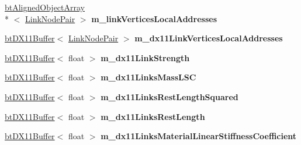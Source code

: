 \begin{DoxyCompactItemize}
\item 
\hypertarget{classbt_soft_body_link_data_d_x11_s_i_m_d_aware_acc9532e1a7457a277f5bc7fff7cd028b}{\hyperlink{classbt_aligned_object_array}{bt\+Aligned\+Object\+Array}\\*
$<$ \hyperlink{classbt_soft_body_link_data_1_1_link_node_pair}{Link\+Node\+Pair} $>$ {\bfseries m\+\_\+link\+Vertices\+Local\+Addresses}}\label{classbt_soft_body_link_data_d_x11_s_i_m_d_aware_acc9532e1a7457a277f5bc7fff7cd028b}

\item 
\hypertarget{classbt_soft_body_link_data_d_x11_s_i_m_d_aware_ab89aba249daf8a40190fc208f2df0403}{\hyperlink{classbt_d_x11_buffer}{bt\+D\+X11\+Buffer}$<$ \hyperlink{classbt_soft_body_link_data_1_1_link_node_pair}{Link\+Node\+Pair} $>$ {\bfseries m\+\_\+dx11\+Link\+Vertices\+Local\+Addresses}}\label{classbt_soft_body_link_data_d_x11_s_i_m_d_aware_ab89aba249daf8a40190fc208f2df0403}

\item 
\hypertarget{classbt_soft_body_link_data_d_x11_s_i_m_d_aware_a219c48253b7715d8bd642c0ba37d5d36}{\hyperlink{classbt_d_x11_buffer}{bt\+D\+X11\+Buffer}$<$ float $>$ {\bfseries m\+\_\+dx11\+Link\+Strength}}\label{classbt_soft_body_link_data_d_x11_s_i_m_d_aware_a219c48253b7715d8bd642c0ba37d5d36}

\item 
\hypertarget{classbt_soft_body_link_data_d_x11_s_i_m_d_aware_a690735a2a6db8264d0648b706cb28d03}{\hyperlink{classbt_d_x11_buffer}{bt\+D\+X11\+Buffer}$<$ float $>$ {\bfseries m\+\_\+dx11\+Links\+Mass\+L\+S\+C}}\label{classbt_soft_body_link_data_d_x11_s_i_m_d_aware_a690735a2a6db8264d0648b706cb28d03}

\item 
\hypertarget{classbt_soft_body_link_data_d_x11_s_i_m_d_aware_ad003b579e9a36d503de679a340011a2a}{\hyperlink{classbt_d_x11_buffer}{bt\+D\+X11\+Buffer}$<$ float $>$ {\bfseries m\+\_\+dx11\+Links\+Rest\+Length\+Squared}}\label{classbt_soft_body_link_data_d_x11_s_i_m_d_aware_ad003b579e9a36d503de679a340011a2a}

\item 
\hypertarget{classbt_soft_body_link_data_d_x11_s_i_m_d_aware_aef68cc35928ddca5c7fc0fea5aec8004}{\hyperlink{classbt_d_x11_buffer}{bt\+D\+X11\+Buffer}$<$ float $>$ {\bfseries m\+\_\+dx11\+Links\+Rest\+Length}}\label{classbt_soft_body_link_data_d_x11_s_i_m_d_aware_aef68cc35928ddca5c7fc0fea5aec8004}

\item 
\hypertarget{classbt_soft_body_link_data_d_x11_s_i_m_d_aware_ab907e0afddb5b4fc2cbe511bbaeca8cf}{\hyperlink{classbt_d_x11_buffer}{bt\+D\+X11\+Buffer}$<$ float $>$ {\bfseries m\+\_\+dx11\+Links\+Material\+Linear\+Stiffness\+Coefficient}}\label{classbt_soft_body_link_data_d_x11_s_i_m_d_aware_ab907e0afddb5b4fc2cbe511bbaeca8cf}


\end{DoxyCompactItemize}
